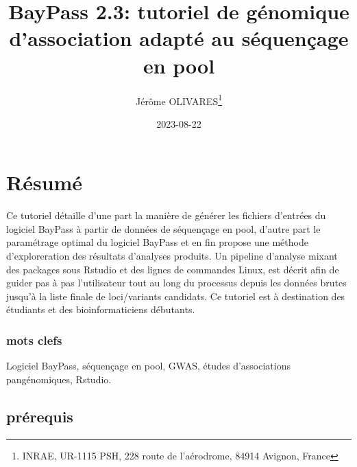 \documentclass[
  openany]{book}
\title{BayPass 2.3: tutoriel de génomique d'association adapté au séquençage en pool}
\author{Jérôme OLIVARES\footnote{INRAE, UR-1115 PSH, 228 route de l'aérodrome, 84914 Avignon, France}}
\date{2023-08-22}
\theoremstyle{definition}
\theoremstyle{definition}
\theoremstyle{definition}
\theoremstyle{definition}
\theoremstyle{remark}
\begin{document}
\maketitle

{
\hypersetup{linkcolor=}
\setcounter{tocdepth}{1}
\tableofcontents
}
\hypertarget{ruxe9sumuxe9}{%
\chapter*{Résumé}\label{ruxe9sumuxe9}}

Ce tutoriel détaille d'une part la manière de générer les fichiers d'entrées du logiciel BayPass à partir de données de séquençage en pool, d'autre part le paramétrage optimal du logiciel BayPass et en fin propose une méthode d'exploreration des résultats d'analyses produits. Un pipeline d'analyse mixant des packages sous Rstudio et des lignes de commandes Linux, est décrit afin de guider pas à pas l'utilisateur tout au long du processus depuis les données brutes jusqu'à la liste finale de loci/variants candidats.
Ce tutoriel est à destination des étudiants et des bioinformaticiens débutants.

\hypertarget{mots-clefs}{%
\subsection*{mots clefs}\label{mots-clefs}}

Logiciel BayPass, séquençage en pool, GWAS, études d'associations pangénomiques, Rstudio.

\hypertarget{pruxe9requis}{%
\section*{prérequis}\label{pruxe9requis}}
\end{document}
